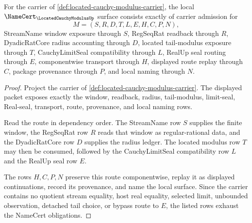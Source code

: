 \begin{theorem}
\label{thm:located-cauchy-modulus-namecert-obligations}
For the carrier of \autoref{def:located-cauchy-modulus-carrier}, the local $\NameCert_{\LocatedCauchyModulusUp}$ surface consists exactly of carrier admission for
$$
M=(S,R,D,T,L,E,H,C,P,N),
$$
StreamName window exposure through $S$, RegSeqRat readback through $R$, DyadicRatCore radius accounting through $D$, located tail-modulus exposure through $T$, CauchyLimitSeal compatibility through $L$, RealUp seal routing through $E$, componentwise transport through $H$, displayed route replay through $C$, package provenance through $P$, and local naming through $N$.
\end{theorem}
\begin{proof}
Project the carrier of \autoref{def:located-cauchy-modulus-carrier}. The displayed packet exposes exactly the window, readback, radius, tail-modulus, limit-seal, Real-seal, transport, route, provenance, and local naming rows.

Read the route in dependency order. The StreamName row $S$ supplies the finite window, the RegSeqRat row $R$ reads that window as regular-rational data, and the DyadicRatCore row $D$ supplies the radius ledger. The located modulus row $T$ may then be consumed, followed by the CauchyLimitSeal compatibility row $L$ and the RealUp seal row $E$.

The rows $H,C,P,N$ preserve this route componentwise, replay it as displayed continuations, record its provenance, and name the local surface. Since the carrier contains no quotient stream equality, host real equality, selected limit, unbounded observation, detached tail choice, or bypass route to $E$, the listed rows exhaust the NameCert obligations.
\end{proof}

